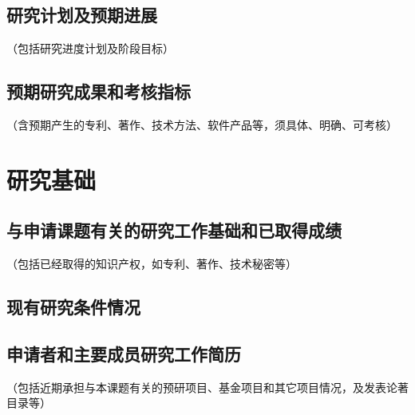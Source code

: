 \documentclass{ctexart}
\begin{document}
\subsection{研究计划及预期进展}
（包括研究进度计划及阶段目标）

\subsection{预期研究成果和考核指标}
（含预期产生的专利、著作、技术方法、软件产品等，须具体、明确、可考核）




\section{研究基础}

\subsection{与申请课题有关的研究工作基础和已取得成绩}
（包括已经取得的知识产权，如专利、著作、技术秘密等）

\subsection{现有研究条件情况}

\subsection{申请者和主要成员研究工作简历}
（包括近期承担与本课题有关的预研项目、基金项目和其它项目情况，及发表论著目录等）






\end{document}
